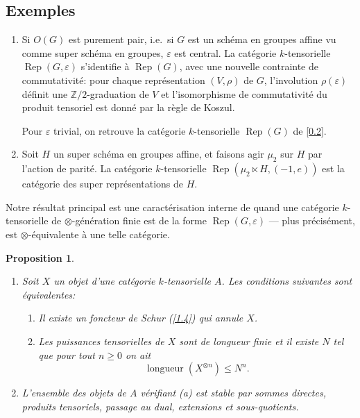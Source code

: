 \documentclass[11pt,a4paper]{article}
\theoremstyle{plain}
\newtheorem{proposition}[theorem]{Proposition}
\theoremstyle{definition}
\DeclareMathOperator{\longueur}{longueur}
\newcommand{\Rep}{\operatorname{Rep}}
\begin{document}
\subsection{Exemples}
\label{0.4}

\begin{enumerate}
\item[(i)] Si $O(G)$ est purement pair, i.e.~si $G$ est un sch\'ema en groupes affine vu comme super sch\'ema en groupes, $\varepsilon$ est central. La cat\'egorie $k$-tensorielle $\Rep(G,\varepsilon)$ s'identifie \`a $\Rep(G)$, avec une nouvelle contrainte de commutativit\'e: pour chaque repr\'esentation $(V,\rho)$ de $G$, l'involution $\rho(\varepsilon)$ d\'efinit une $\mathbb{Z}/2$-graduation de $V$ et l'isomorphisme de commutativit\'e du produit tensoriel est donn\'e par la r\`egle de Koszul.

Pour $\varepsilon$ trivial, on retrouve la cat\'egorie $k$-tensorielle $\Rep(G)$ de \ref{0.2}.
\item[(ii)] Soit $H$ un super sch\'ema en groupes affine, et faisons agir $\mu_2$ sur $H$ par l'action de parit\'e. La cat\'egorie $k$-tensorielle $\Rep(\mu_2\ltimes H,(-1,e))$ est la cat\'egorie des super repr\'esentations de $H$.
\end{enumerate}

Notre r\'esultat principal est une caract\'erisation interne de quand une cat\'egorie $k$-tensorielle de $\otimes$-g\'en\'eration finie est de la forme $\Rep(G,\varepsilon)$ --- plus pr\'ecis\'ement, est $\otimes$-\'equivalente \`a une telle cat\'egorie.

\begin{proposition}\label{0.5}
\begin{enumerate}
\item[(i)] Soit $X$ un objet d'une cat\'egorie $k$-tensorielle $A$. Les conditions suivantes sont \'equivalentes:
\begin{enumerate}
\item[(a)] Il existe un foncteur de Schur (\ref{1.4}) qui annule $X$.
\item[(b)] Les puissances tensorielles de $X$ sont de longueur finie et il existe $N$ tel que pour tout $n\geq0$ on ait
\[
\longueur(X^{\otimes n})\leq N^n.
\]
\end{enumerate}
\item[(ii)] L'ensemble des objets de $A$ v\'erifiant (a) est stable par sommes directes, produits tensoriels, passage au dual, extensions et sous-quotients.
\end{enumerate}
\end{proposition}
\end{document}
